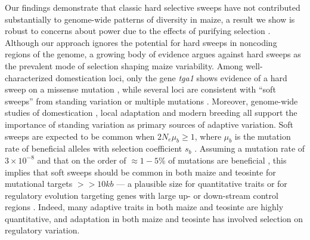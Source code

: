\documentclass[twoside, twocolumn, letterpaper]{article}
\begin{document}
Our findings demonstrate that classic hard selective sweeps have not contributed substantially to genome-wide patterns of diversity in maize, a result we show is robust to concerns about power due to the effects of purifying selection  \cite{enard2014}. 
Although our approach ignores the potential for hard sweeps in noncoding regions of the genome, a growing body of evidence argues against hard sweeps as the prevalent mode of selection shaping maize variability. 
Among well-characterized domestication loci, only the gene \emph{tga1} shows evidence of a hard sweep on a missense mutation \cite{wang2015}, while several loci are consistent with ``soft sweeps''  from standing variation \cite{studer2011,gallavotti2004role} or multiple mutations \cite{wills2013}. 
Moreover, genome-wide studies of domestication \cite{hufford2012},  local adaptation \cite{Takuno15062015} and modern breeding \cite{van2012historical, beissinger2014} all support the importance of standing variation as primary sources of adaptive variation. 
Soft sweeps are expected to be common when $2N_e\mu_b \ge 1$, where $\mu_b$ is the mutation rate of beneficial alleles with selection coefficient $s_b$ \cite{messer2013}. Assuming a mutation rate of $3 \times 10^{-8}$ \cite{clark2005} and that on the order of $\approx 1-5\%$ of mutations are beneficial \cite{eyre2007}, this implies that soft sweeps should be common in both maize and teosinte for mutational targets $>>10kb$ --- a plausible size for quantitative traits or for regulatory evolution targeting genes with large up- or down-stream control regions \cite[e.g.]{studer2011}.
Indeed, many adaptive traits in both maize \cite{wallace2014} and teosinte \cite{weber2008} are highly quantitative,  and adaptation in both maize \cite{hufford2012} and teosinte \cite{pyhajarvi2013} has involved selection on regulatory variation.
\end{document}
